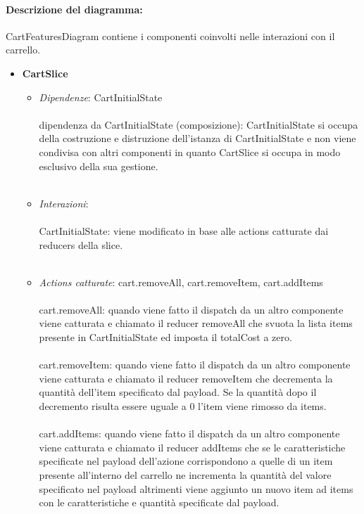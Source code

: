 \paragraph*{Descrizione del diagramma:}
CartFeaturesDiagram contiene i componenti coinvolti nelle interazioni con il carrello.
\begin{itemize}
		\item \textbf{CartSlice}
		\begin{itemize}
			\item \textit{Dipendenze}: CartInitialState
			\\\\
			dipendenza da CartInitialState (composizione): CartInitialState si occupa della costruzione e distruzione dell'istanza di CartInitialState
			e non viene condivisa con altri componenti in quanto CartSlice si occupa in modo esclusivo della sua gestione.
			\\\\
			\item \textit{Interazioni}:
			\\\\
			CartInitialState: viene modificato in base alle actions catturate dai reducers della slice.
			\\\\
			\item \textit{Actions catturate}: cart.removeAll, cart.removeItem, cart.addItems
			\\\\
			cart.removeAll: quando viene fatto il dispatch da un altro componente viene catturata e chiamato il reducer removeAll che svuota la lista items presente in
			CartInitialState ed imposta il totalCost a zero.
			\\\\
			cart.removeItem: quando viene fatto il dispatch da un altro componente viene catturata e chiamato il reducer removeItem che 
			decrementa la quantità dell'item specificato dal payload.
			Se la quantità dopo il decremento risulta essere uguale a 0 l'item viene rimosso da items.
			\\\\
			cart.addItems: quando viene fatto il dispatch da un altro componente viene catturata e chiamato il reducer addItems che se le caratteristiche 
			specificate nel payload dell'azione corrispondono a quelle di un item presente all'interno del carrello ne incrementa la quantità del valore
			specificato nel payload altrimenti viene aggiunto un nuovo item ad items con le caratteristiche e quantità specificate dal payload.  

\end{itemize}
\end{itemize}
